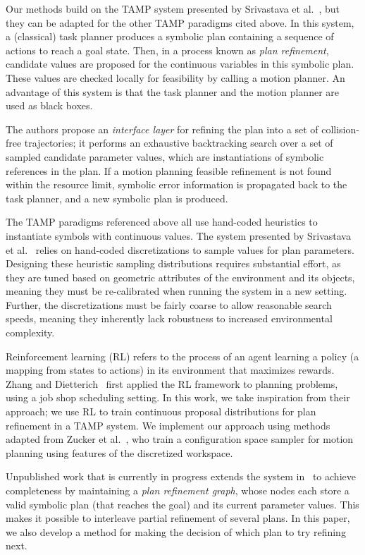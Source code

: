 Our methods build on the TAMP system presented by Srivastava et al.~\cite{srivastava2014combined},
but they can be adapted for the other TAMP paradigms cited above.
In this system, a (classical) task planner produces a symbolic plan containing
a sequence of actions to reach a goal state. Then, in a process known as \emph{plan refinement},
candidate values are proposed for the continuous variables in this symbolic plan.
These values are checked locally for feasibility by calling a motion planner.
An advantage of this system is that the task planner and the motion planner are used as black boxes.

The authors propose an \emph{interface layer} for refining the plan into a set
of collision-free trajectories; it performs an exhaustive backtracking search over a
set of sampled candidate parameter values, which are instantiations of symbolic references in the plan. If a motion planning feasible
refinement is not found within the resource limit, symbolic error information is
propagated back to the task planner, and a new symbolic plan is produced.

The TAMP paradigms referenced above all use hand-coded heuristics to instantiate symbols with continuous values.
The system presented by Srivastava et al.~\cite{srivastava2014combined} relies on hand-coded discretizations to sample values for
plan parameters. Designing these heuristic sampling distributions requires substantial effort,
as they are tuned based on geometric attributes of the environment and its objects, meaning they
must be re-calibrated when running the system in a new setting. Further,
the discretizations must be fairly coarse to allow reasonable search speeds, meaning they inherently lack
robustness to increased environmental complexity.

Reinforcement learning (RL) refers to the process of an agent learning a policy (a mapping from states to actions)
in its environment that maximizes rewards. Zhang and Dietterich~\cite{JobShopSched} first applied the RL framework
to planning problems, using a job shop scheduling setting. In this work, we take inspiration from
their approach; we use RL to train continuous proposal distributions for
plan refinement in a TAMP system. We implement our approach using methods adapted from
Zucker et al.~\cite{workspacebias}, who train a configuration space sampler for motion planning
using features of the discretized workspace.

Unpublished work that is currently in progress extends the system in~\cite{srivastava2014combined} to achieve completeness by
maintaining a \emph{plan refinement graph}, whose nodes each store a valid
symbolic plan (that reaches the goal) and its current parameter values. This makes it possible to interleave
partial refinement of several plans. In this paper, we also develop a method for making the decision of
which plan to try refining next.

